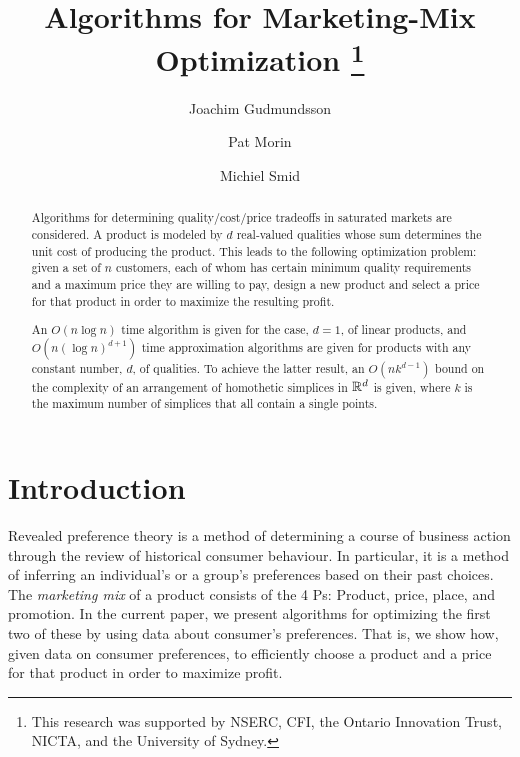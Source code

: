 \documentclass{llncs}
\begin{document}
\title{Algorithms for Marketing-Mix Optimization%
      \thanks{This research was supported by NSERC, CFI, the Ontario Innovation Trust, NICTA, and the University of Sydney.}}
\author{Joachim Gudmundsson
	\and Pat Morin
	\and Michiel Smid}

\maketitle

\begin{abstract}
  Algorithms for determining quality/cost/price tradeoffs in saturated
  markets are considered.  A product is modeled by $d$ real-valued
  qualities whose sum determines the unit cost of producing the product.
  This leads to the following optimization problem: given a set of $n$
  customers, each of whom has certain minimum quality requirements and a
  maximum price they are willing to pay, design a new product and select
  a price for that product in order to maximize the resulting profit.

  An $O(n\log n)$ time algorithm is given for the case, $d=1$, of linear
  products, and $O(n(\log n)^{d+1})$ time approximation algorithms
  are given for products with any constant number, $d$, of qualities.
  To achieve the latter result, an $O(nk^{d-1})$ bound on the complexity
  of an arrangement of homothetic simplices in $\mathbb{R}^d$ is given, where $k$
  is the maximum number of simplices that all contain a single points.
\end{abstract}

\section{Introduction}

Revealed preference theory \cite{v06} is a method of determining a course
of business action through the review of historical consumer behaviour.  In
particular, it is a method of inferring an individual's or a group's
preferences based on their past choices.  The \emph{marketing mix}
\cite{kpkl05} of a product consists of the 4 Ps: Product, price, place, and
promotion.  In the current paper, we present algorithms for optimizing the
first two of these by using data about consumer's preferences.  That is, we
show how, given data on consumer preferences, to efficiently choose a
product and a price for that product in order to maximize profit.
\end{document}
